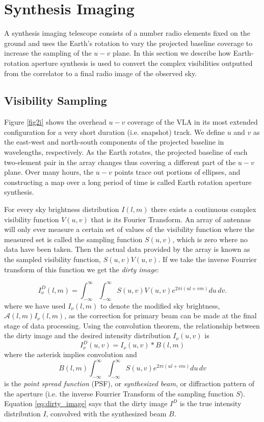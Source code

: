 \section{Synthesis Imaging}\label{sec:4}
A synthesis imaging telescope consists of a number radio elements fixed on the ground and uses the Earth's rotation to vary the projected baseline coverage to increase the sampling of the $u-v$ plane. In this section we describe how Earth-rotation aperture synthesis is used to convert the complex visibilities outputted from the correlator to a final radio image of the observed sky.
\subsection{Visibility Sampling}\label{subsec:x}
Figure \ref{fig2i}  shows the overhead $u-v$ coverage of the VLA in its most extended configuration for a very short duration (i.e. snapshot) track. We define $u$ and $v$ as the east-west and north-south components of the projected baseline in wavelengths, respectively. As the Earth rotates, the projected baseline of each two-element pair in the array changes thus covering a different part of the $u-v$ plane. Over many hours, the $u-v$ points trace out portions of ellipses, and constructing a map over a long period of time is called Earth rotation aperture synthesis.

For every sky brightness distribution $I(l,m)$ there exists a continuous complex visibility function $V(u,v)$ that is its Fourier Transform. An array of antennas will only ever measure a certain set of values of the visibility function where the measured set is called the sampling function $S(u,v)$, which is zero where no data have been taken. Then the actual data provided by the array is known as the sampled visibility function, $S(u,v)V(u,v)$. If we take the inverse Fourrier transform of this function we get the \textit{dirty image}:

\begin{equation}
I_{\nu}^{D}(l,m)=\int ^{\infty}_{-\infty}\int ^{\infty}_{-\infty}S(u,v)V(u,v)\mathit{e}^{2\pi \mathit{i}(ul+vm)}du\,dv.
\end{equation}
where we have used $I_{\nu}(l,m)$ to denote the modified sky brightness, $\mathcal{A}(l,m)I_{\nu}(l,m)$, as the correction for primary beam can be made at the final stage of data processing. Using the convolution theorem, the relationship between the dirty image and the desired intensity distribution $I_{\nu}(u,v)$ is
\begin{equation}\label{eq:dirty_image}
I_{\nu}^{D}(u,v)=I_{\nu}(u,v)*B(l,m)
\end{equation}
where the asterisk implies convolution and
\begin{equation}
B(l,m)\int ^{\infty}_{-\infty}\int ^{\infty}_{-\infty}S(u,v)\mathit{e}^{2\pi \mathit{i}(ul+vm)}du\,dv
\end{equation}
is the \textit{point spread function} (PSF), or \textit{synthesized beam}, or diffraction pattern of the aperture (i.e. the inverse Fourrier Transform of the sampling function $S$). Equation \ref{eq:dirty_image} says that the dirty image $I^{D}$ is the true intensity distribution $I$, convolved with the synthesized beam $B$.


